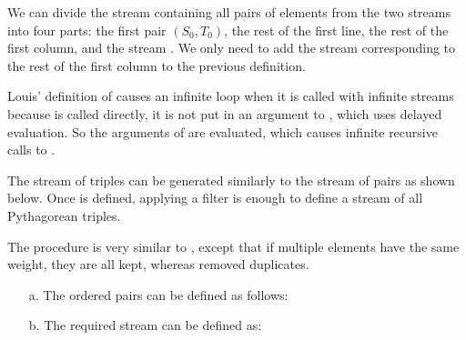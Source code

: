 \begin{exe}[3.67]
    We can divide the stream  containing all pairs of 
    elements from the two streams into four parts: the first pair $(S_0, T_0)$, 
    the rest of the first line, the rest of the first column, and the stream
    . We only need to add the 
    stream corresponding to the rest of the first column to the previous 
    definition.
\end{exe}

\begin{exe}[3.68]
    Louis’ definition of  causes an infinite loop when it is called 
    with infinite streams because  is called directly, it is 
    not put in an argument to , which uses delayed evaluation. 
    So the arguments of  are evaluated, which causes infinite 
    recursive calls to .
\end{exe}

\begin{exe}[3.69]
    The stream of triples can be generated similarly to the stream of pairs as 
    shown below. Once  is defined, applying a filter is enough to 
    define a stream of all Pythagorean triples.
\end{exe}

\begin{exe}[3.70]
    The  procedure is very similar to , except 
    that if multiple elements have the same weight, they are all kept, whereas 
     removed duplicates.
    \begin{itemize}
        \item[a.] The ordered pairs can be defined as follows:
        \item[b.] The required stream can be defined as:
    \end{itemize}
\end{exe}

